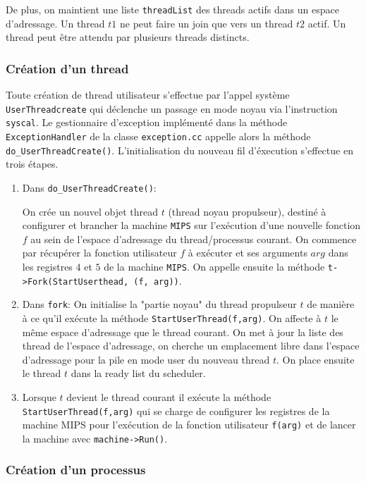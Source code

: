 \documentclass[11pt]{article}
\theoremstyle{definition}
\theoremstyle{definition}
\begin{document}
De plus, on maintient une liste \texttt{threadList} des threads actifs dans un espace d'adressage.
Un thread $t1$ ne peut faire un join que vers un thread $t2$ actif.
Un thread peut être attendu par plusieurs threads distincts.

\subsubsection{Création d'un thread}
Toute création de thread utilisateur s'effectue par l'appel système
\texttt{UserThreadcreate}
qui déclenche un passage en mode noyau via l'instruction \texttt{syscal}.
Le gestionnaire d'exception implémenté dans la méthode \texttt{ExceptionHandler} de la classe
\texttt{exception.cc} appelle alors la méthode \texttt{do\_UserThreadCreate()}.
L'initialisation du nouveau fil d'éxecution s'effectue en trois étapes.

\begin{enumerate}
\item Dans \texttt{do\_UserThreadCreate()}:

On crée un nouvel objet thread $t$ (thread noyau propulseur), destiné à configurer et brancher la machine \texttt{MIPS} sur l'exécution d'une nouvelle fonction $f$ au sein de l'espace d'adressage du thread/processus courant.
On commence par récupérer la fonction utilisateur $f$ à exécuter et ses arguments $arg$ dans les registres $4$ et $5$ de la machine \texttt{MIPS}. On appelle ensuite la méthode \texttt{t->Fork(StartUserthead, (f, arg))}.

\item Dans \texttt{fork}:
On initialise la "partie noyau" du thread propulseur $t$ de manière
à ce qu'il exécute la méthode \texttt{StartUserThread(f,arg)}. On affecte à $t$ le même espace d'adressage que le thread courant. On met à jour la liste des thread de l'espace d'adressage, on cherche un emplacement
libre dans l'espace d'adressage pour la pile en mode user du nouveau thread $t$.
On place ensuite le thread $t$ dans la ready list du scheduler.

\item Lorsque $t$ devient le thread courant il exécute la méthode \texttt{StartUserThread(f,arg)}
qui se charge de configurer les registres de la machine MIPS pour l'exécution
de la fonction utilisateur \texttt{f(arg)} et de lancer la machine avec \texttt{machine->Run()}. 
\end{enumerate}

\subsubsection{Création d'un processus}
\end{document}
